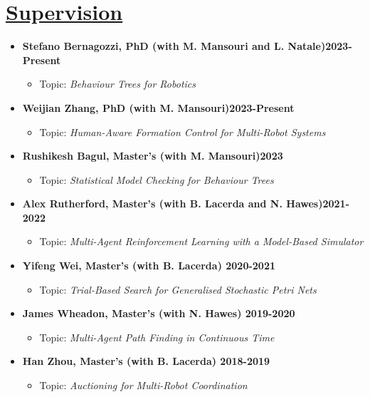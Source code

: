\documentclass[11pt]{article}
\begin{document}
\vspace{-10pt}
\section*{\uline{Supervision\hfill}}
\vspace{-5pt}
\begin{itemize}
\item \textbf{Stefano Bernagozzi, PhD (with M. Mansouri and L. Natale)\hfill 2023-Present}
\begin{itemize}
\item Topic: \emph{Behaviour Trees for Robotics}
\end{itemize}
\item \textbf{Weijian Zhang, PhD (with M. Mansouri)\hfill 2023-Present}
\begin{itemize}
\item Topic: \emph{Human-Aware Formation Control for Multi-Robot Systems}
\end{itemize}
\item \textbf{Rushikesh Bagul, Master's (with M. Mansouri)\hfill 2023}
\begin{itemize}
\item Topic: \emph{Statistical Model Checking for Behaviour Trees}
\end{itemize}
\item \textbf{Alex Rutherford, Master's (with B. Lacerda and N. Hawes)\hfill 2021-2022}
\begin{itemize}
\item Topic: \emph{Multi-Agent Reinforcement Learning with a Model-Based Simulator}
\end{itemize}
\item \textbf{Yifeng Wei, Master's (with B. Lacerda) \hfill 2020-2021}
\begin{itemize}
\item Topic: \emph{Trial-Based Search for Generalised Stochastic Petri Nets}
\end{itemize} 
\item \textbf{James Wheadon, Master's (with N. Hawes) \hfill 2019-2020}
\begin{itemize}
\item  Topic: \emph{Multi-Agent Path Finding in Continuous Time}
\end{itemize}
\item \textbf{Han Zhou, Master's (with B. Lacerda) \hfill 2018-2019}
\begin{itemize}
\item Topic: \emph{Auctioning for Multi-Robot Coordination}

\end{itemize}
\end{itemize}
\end{document}
